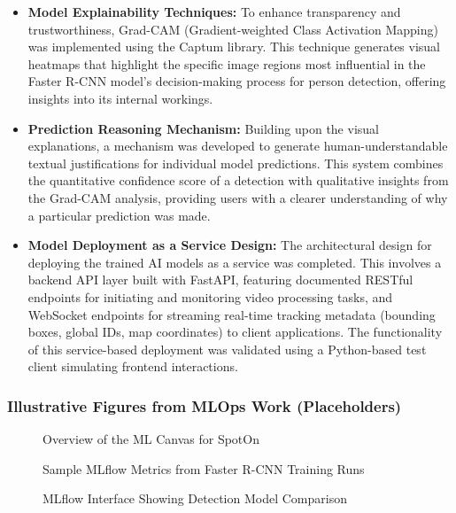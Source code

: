 \begin{itemize}
    \item \textbf{Model Explainability Techniques:} To enhance transparency and trustworthiness, Grad-CAM (Gradient-weighted Class Activation Mapping) was implemented using the Captum library. This technique generates visual heatmaps that highlight the specific image regions most influential in the Faster R-CNN model's decision-making process for person detection, offering insights into its internal workings.
    \item \textbf{Prediction Reasoning Mechanism:} Building upon the visual explanations, a mechanism was developed to generate human-understandable textual justifications for individual model predictions. This system combines the quantitative confidence score of a detection with qualitative insights from the Grad-CAM analysis, providing users with a clearer understanding of why a particular prediction was made.
    \item \textbf{Model Deployment as a Service Design:} The architectural design for deploying the trained AI models as a service was completed. This involves a backend API layer built with FastAPI, featuring documented RESTful endpoints for initiating and monitoring video processing tasks, and WebSocket endpoints for streaming real-time tracking metadata (bounding boxes, global IDs, map coordinates) to client applications. The functionality of this service-based deployment was validated using a Python-based test client simulating frontend interactions.
\end{itemize}

\subsubsection*{Illustrative Figures from MLOps Work (Placeholders)}
\begin{figure}[!htb]
    \centering
    \caption{Overview of the ML Canvas for SpotOn}
    \label{fig:progress_ml_canvas}
\end{figure}

\begin{figure}[!htb]
    \centering
    \caption{Sample MLflow Metrics from Faster R-CNN Training Runs}
    \label{fig:progress_mlflow_training_metrics}
\end{figure}

\begin{figure}[!htb]
    \centering
    \caption{MLflow Interface Showing Detection Model Comparison}
    \label{fig:progress_mlflow_model_comparison}
\end{figure}

